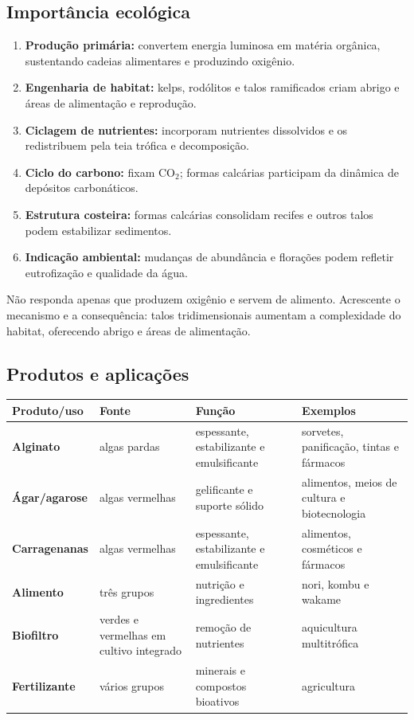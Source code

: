 \documentclass[12pt,a4paper]{article}
\begin{document}
\subsection{Importância ecológica}
\begin{enumerate}
\item \textbf{Produção primária:} convertem energia luminosa em matéria
orgânica, sustentando cadeias alimentares e produzindo oxigênio.
\item \textbf{Engenharia de habitat:} kelps, rodólitos e talos ramificados
criam abrigo e áreas de alimentação e reprodução.
\item \textbf{Ciclagem de nutrientes:} incorporam nutrientes dissolvidos e os
redistribuem pela teia trófica e decomposição.
\item \textbf{Ciclo do carbono:} fixam CO$_2$; formas calcárias participam da
dinâmica de depósitos carbonáticos.
\item \textbf{Estrutura costeira:} formas calcárias consolidam recifes e outros
talos podem estabilizar sedimentos.
\item \textbf{Indicação ambiental:} mudanças de abundância e florações podem
refletir eutrofização e qualidade da água.
\end{enumerate}

\begin{raciocinio}
Não responda apenas que produzem oxigênio e servem de alimento. Acrescente o
mecanismo e a consequência: talos tridimensionais aumentam a complexidade do
habitat, oferecendo abrigo e áreas de alimentação.
\end{raciocinio}

\subsection{Produtos e aplicações}
\begin{center}
\begin{tabularx}{\textwidth}{>{\bfseries}p{}p{}YY}
\toprule
Produto/uso & Fonte & Função & Exemplos\\
\midrule
Alginato & algas pardas & espessante, estabilizante e emulsificante & sorvetes,
panificação, tintas e fármacos\\
Ágar/agarose & algas vermelhas & gelificante e suporte sólido & alimentos, meios
de cultura e biotecnologia\\
Carragenanas & algas vermelhas & espessante, estabilizante e emulsificante &
alimentos, cosméticos e fármacos\\
Alimento & três grupos & nutrição e ingredientes & nori, kombu e wakame\\
Biofiltro & verdes e vermelhas em cultivo integrado & remoção de nutrientes &
aquicultura multitrófica\\
Fertilizante & vários grupos & minerais e compostos bioativos & agricultura\\
\bottomrule
\end{tabularx}
\end{center}
\end{document}
